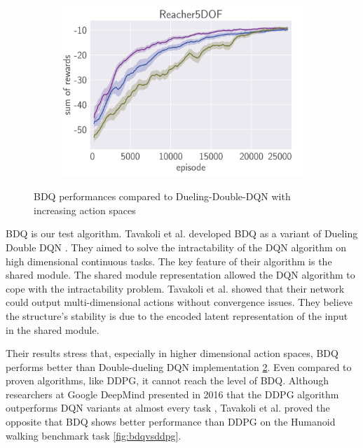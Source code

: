 \begin{figure}[htbp]
    \hspace*{\fill}   %
    \begin{subfigure}{0.31\textwidth}
      \includegraphics[width=\linewidth]{figures/BDQ3.png}
      \caption{} \label{fig:1b}
    \end{subfigure}%

\caption{BDQ performances compared to Dueling-Double-DQN with increasing action spaces \label{fig:BDQvsDDQN}}
\end{figure}

BDQ is our test algorithm. Tavakoli et al. developed BDQ as a variant of Dueling Double DQN \cite{Tavakoli2018}. They aimed to solve the intractability of the DQN algorithm on high dimensional continuous tasks. The key feature of their algorithm is the shared module. The shared module representation allowed the DQN algorithm to cope with the intractability problem. Tavakoli et al. showed that their network could output multi-dimensional actions without convergence issues. They believe the structure's stability is due to the encoded latent representation of the input in the shared module.

Their results stress that, especially in higher dimensional action spaces, BDQ performs better than Double-dueling DQN implementation \ref{fig:BDQvsDDQN}. Even compared to proven algorithms, like DDPG, it cannot reach the level of BDQ. Although researchers at Google DeepMind presented in 2016 that the DDPG algorithm outperforms DQN variants at almost every task \cite{Lillicrap2016}, Tavakoli et al. proved the opposite that BDQ shows better performance than DDPG on the Humanoid walking benchmark task \ref{fig:bdqvsddpg}.

